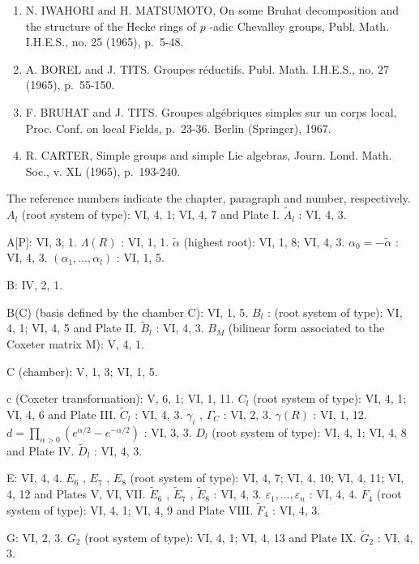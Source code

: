 \begin{enumerate}
\item
  N. IWAHORI and H. MATSUMOTO, On some Bruhat decomposition and the structure of the Hecke rings of \(p\) -adic Chevalley groups, Publ. Math. I.H.E.S., no. 25 (1965), p.~5-48.
\item
  A. BOREL and J. TITS. Groupes réductifs. Publ. Math. I.H.E.S., no. 27 (1965), p.~55-150.
\item
  F. BRUHAT and J. TITS. Groupes algébriques simples sur un corps local, Proc. Conf. on local Fields, p.~23-36. Berlin (Springer), 1967.
\item
  R. CARTER, Simple groups and simple Lie algebras, Journ. Lond. Math. Soc., v. XL (1965), p.~193-240.
\end{enumerate}


The reference numbers indicate the chapter, paragraph and number, respectively. \(A_{l}\) (root system of type): VI, 4, 1; VI, 4, 7 and Plate I. \(\tilde{A}_{l}\) : VI, 4, 3.

A{[}P{]}: VI, 3, 1. \(\Lambda(R)\) : VI, 1, 1. \(\tilde{\alpha}\) (highest root): VI, 1, 8; VI, 4, 3. \(\alpha_{0} = -\tilde{\alpha}\) : VI, 4, 3. \((\alpha_{1}, \ldots, \alpha_{l})\) : VI, 1, 5.

B: IV, 2, 1.

B(C) (basis defined by the chamber C): VI, 1, 5. \(B_{l}\) : (root system of type): VI, 4, 1; VI, 4, 5 and Plate II. \(\tilde{B}_{l}\) : VI, 4, 3. \(B_{M}\) (bilinear form associated to the Coxeter matrix M): V, 4, 1.

C (chamber): V, 1, 3; VI, 1, 5.

c (Coxeter transformation): V, 6, 1; VI, 1, 11. \(C_{l}\) (root system of type): VI, 4, 1; VI, 4, 6 and Plate III. \(\tilde{C}_{l}\) : VI, 4, 3. \(\gamma_{i}\) , \(\Gamma_{C}\) : VI, 2, 3. \(\gamma(R)\) : VI, 1, 12. \(d = \prod_{\alpha > 0} (e^{\alpha/2} - e^{-\alpha/2})\) : VI, 3, 3. \(D_{l}\) (root system of type): VI, 4, 1; VI, 4, 8 and Plate IV. \(\tilde{D}_{l}\) : VI, 4, 3.

E: VI, 4, 4. \(E_{6}\) , \(E_{7}\) , \(E_{8}\) (root system of type): VI, 4, 7; VI, 4, 10; VI, 4, 11; VI, 4, 12 and Plates V, VI, VII. \(\tilde{E}_{6}\) , \(\tilde{E}_{7}\) , \(\tilde{E}_{8}\) : VI, 4, 3. \(\varepsilon_{1}, \ldots, \varepsilon_{n}\) : VI, 4, 4. \(F_{4}\) (root system of type): VI, 4, 1; VI, 4, 9 and Plate VIII. \(\tilde{F}_{4}\) : VI, 4, 3.

G: VI, 2, 3. \(G_{2}\) (root system of type): VI, 4, 1; VI, 4, 13 and Plate IX. \(\tilde{G}_{2}\) : VI, 4, 3.

